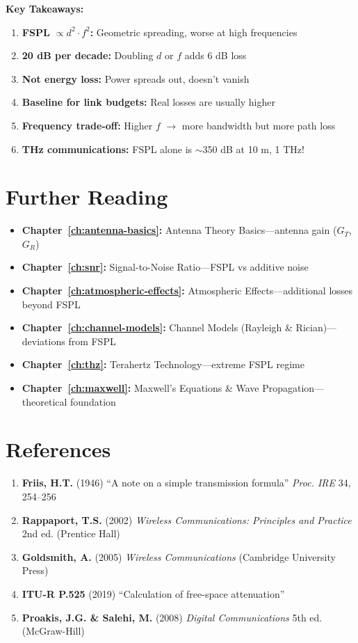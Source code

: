 \begin{keyconcept}
\textbf{Key Takeaways:}
\begin{enumerate}
\item \textbf{FSPL $\propto d^2 \cdot f^2$:} Geometric spreading, worse at high frequencies
\item \textbf{20 dB per decade:} Doubling $d$ or $f$ adds 6 dB loss
\item \textbf{Not energy loss:} Power spreads out, doesn't vanish
\item \textbf{Baseline for link budgets:} Real losses are usually higher
\item \textbf{Frequency trade-off:} Higher $f$ $\rightarrow$ more bandwidth but more path loss
\item \textbf{THz communications:} FSPL alone is $\sim$350 dB at 10 m, 1 THz!
\end{enumerate}
\end{keyconcept}

\section{Further Reading}
\label{sec:further-reading}

\begin{itemize}
\item \textbf{Chapter~\ref{ch:antenna-basics}:} Antenna Theory Basics---antenna gain ($G_T$, $G_R$)
\item \textbf{Chapter~\ref{ch:snr}:} Signal-to-Noise Ratio---FSPL vs additive noise
\item \textbf{Chapter~\ref{ch:atmospheric-effects}:} Atmospheric Effects---additional losses beyond FSPL
\item \textbf{Chapter~\ref{ch:channel-models}:} Channel Models (Rayleigh \& Rician)---deviations from FSPL
\item \textbf{Chapter~\ref{ch:thz}:} Terahertz Technology---extreme FSPL regime
\item \textbf{Chapter~\ref{ch:maxwell}:} Maxwell's Equations \& Wave Propagation---theoretical foundation
\end{itemize}

\section{References}
\label{sec:references}

\begin{enumerate}
\item \textbf{Friis, H.T.} (1946) ``A note on a simple transmission formula'' \textit{Proc. IRE} 34, 254--256
\item \textbf{Rappaport, T.S.} (2002) \textit{Wireless Communications: Principles and Practice} 2nd ed. (Prentice Hall)
\item \textbf{Goldsmith, A.} (2005) \textit{Wireless Communications} (Cambridge University Press)
\item \textbf{ITU-R P.525} (2019) ``Calculation of free-space attenuation''
\item \textbf{Proakis, J.G. \& Salehi, M.} (2008) \textit{Digital Communications} 5th ed. (McGraw-Hill)
\end{enumerate}
